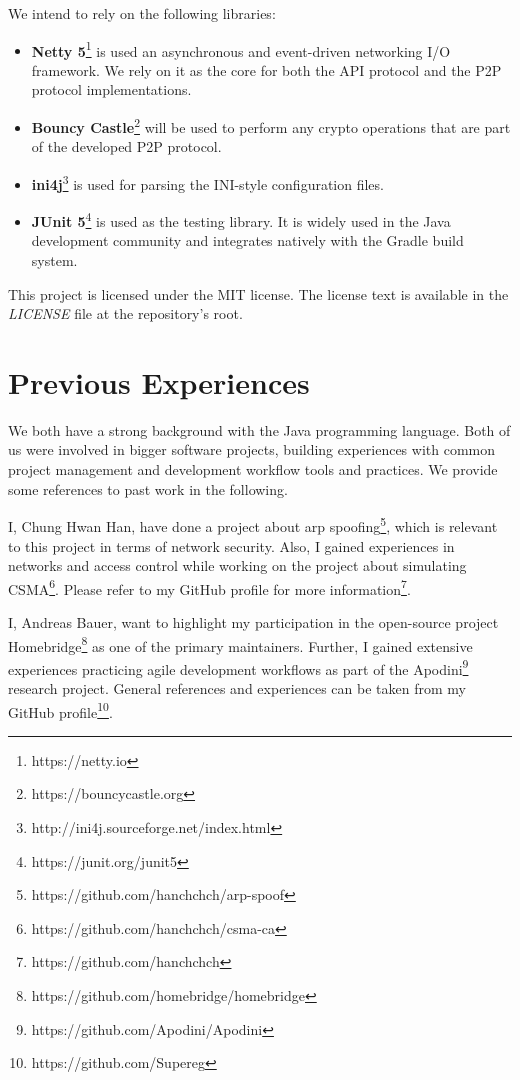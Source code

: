 \documentclass[a4paper, 11pt]{article}
\begin{document}
    We intend to rely on the following libraries:
    \begin{itemize}
        \setlength\itemsep{0em}
        \item \textbf{Netty 5}\footnote{https://netty.io} is used an asynchronous and event-driven networking I/O framework.
        We rely on it as the core for both the API protocol and the P2P protocol implementations.
        \item \textbf{Bouncy Castle}\footnote{https://bouncycastle.org} will be used to perform any crypto operations that are part of the developed P2P protocol.
        \item \textbf{ini4j}\footnote{http://ini4j.sourceforge.net/index.html} is used for parsing the INI-style configuration files.
        \item \textbf{JUnit 5}\footnote{https://junit.org/junit5} is used as the testing library.
        It is widely used in the Java development community and integrates natively with the Gradle build system.
    \end{itemize}

    This project is licensed under the MIT license.
    The license text is available in the \textit{LICENSE} file at the repository's root.

    \section{Previous Experiences}\label{sec:previous-experiences}

    We both have a strong background with the Java programming language.
    Both of us were involved in bigger software projects, building experiences with common project management
    and development workflow tools and practices.
    We provide some references to past work in the following.

    I, Chung Hwan Han, have done a project about arp spoofing\footnote{https://github.com/hanchchch/arp-spoof}, 
    which is relevant to this project in terms of network security.
    Also, I gained experiences in networks and access control while working on the project about simulating CSMA\footnote{https://github.com/hanchchch/csma-ca}.
    Please refer to my GitHub profile for more information\footnote{https://github.com/hanchchch}.
    
    I, Andreas Bauer, want to highlight my participation in the open-source project Homebridge\footnote{https://github.com/homebridge/homebridge}
    as one of the primary maintainers.
    Further, I gained extensive experiences practicing agile development workflows as part of the Apodini\footnote{https://github.com/Apodini/Apodini} research project.
    General references and experiences can be taken from my GitHub profile\footnote{https://github.com/Supereg}.
\end{document}
